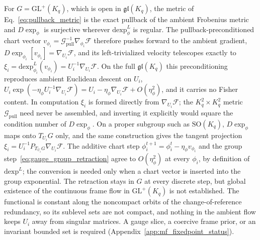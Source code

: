 For $G = \mathrm{GL}^+(K_q)$, which is open in $\mathfrak{gl}(K_q)$, the metric of Eq.~\eqref{eq:pullback_metric} is the exact pullback of the ambient Frobenius metric and $D\exp_\phi$ is surjective wherever $\mathrm{dexp}^{L}_\phi$ is regular. The pullback-preconditioned chart vector $v_{\phi_i} = \mathcal{G}_{\mathrm{pull}}^{-1}\nabla_{\phi_i}\mathcal{F}$ therefore pushes forward to the ambient gradient, $D\exp_{\phi_i}[v_{\phi_i}] = \nabla_{U_i}\mathcal{F}$, and its left-trivialized velocity telescopes exactly to $\xi_i = \mathrm{dexp}^{L}_{\phi_i}(v_{\phi_i}) = U_i^{-1}\nabla_{U_i}\mathcal{F}$. On the full $\mathfrak{gl}(K_q)$ this preconditioning reproduces ambient Euclidean descent on $U_i$, $U_i\exp(-\eta_\phi U_i^{-1}\nabla_{U_i}\mathcal{F}) = U_i - \eta_\phi\nabla_{U_i}\mathcal{F} + O(\eta_\phi^2)$, and it carries no Fisher content. In computation $\xi_i$ is formed directly from $\nabla_{U_i}\mathcal{F}$; the $K_q^2\times K_q^2$ metric $\mathcal{G}_{\mathrm{pull}}$ need never be assembled, and inverting it explicitly would square the condition number of $D\exp_\phi$. On a proper subgroup such as $\mathrm{SO}(K_q)$, $D\exp_\phi$ maps onto $T_{U_i}G$ only, and the same construction gives the tangent projection $\xi_i = U_i^{-1}P_{T_{U_i}G}\nabla_{U_i}\mathcal{F}$. The additive chart step $\phi_i^{t+1} = \phi_i^t - \eta_\phi v_{\phi_i}$ and the group step~\eqref{eq:gauge_group_retraction} agree to $O(\eta_\phi^2)$ at every $\phi_i$, by definition of $\mathrm{dexp}^{L}$; the conversion is needed only when a chart vector is inserted into the group exponential. The retraction stays in $G$ at every discrete step, but global existence of the continuous frame flow in $\mathrm{GL}^+(K_q)$ is not established. The functional is constant along the noncompact orbits of the change-of-reference redundancy, so its sublevel sets are not compact, and nothing in the ambient flow keeps $U_i$ away from singular matrices. A gauge slice, a coercive frame prior, or an invariant bounded set is required (Appendix~\ref{app:mf_fixedpoint_status}).

